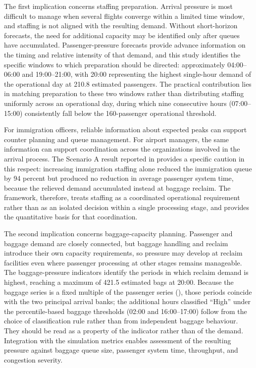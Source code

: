 The first implication concerns staffing preparation. Arrival pressure is most difficult to manage when several flights converge within a limited time window, and staffing is not aligned with the resulting demand. Without short-horizon forecasts, the need for additional capacity may be identified only after queues have accumulated. Passenger-pressure forecasts provide advance information on the timing and relative intensity of that demand, and this study identifies the specific windows to which preparation should be directed: approximately 04:00--06:00 and 19:00--21:00, with 20:00 representing the highest single-hour demand of the operational day at 210.8 estimated passengers. The practical contribution lies in matching preparation to these two windows rather than distributing staffing uniformly across an operational day, during which nine consecutive hours (07:00--15:00) consistently fall below the 160-passenger operational threshold.

For immigration officers, reliable information about expected peaks can support counter planning and queue management. For airport managers, the same information can support coordination across the organizations involved in the arrival process. The Scenario A result reported in  provides a specific caution in this respect: increasing immigration staffing alone reduced the immigration queue by 94 percent but produced no reduction in average passenger system time, because the relieved demand accumulated instead at baggage reclaim. The framework, therefore, treats staffing as a coordinated operational requirement rather than as an isolated decision within a single processing stage, and provides the quantitative basis for that coordination.

The second implication concerns baggage-capacity planning. Passenger and baggage demand are closely connected, but baggage handling and reclaim introduce their own capacity requirements, so pressure may develop at reclaim facilities even where passenger processing at other stages remains manageable. The baggage-pressure indicators identify the periods in which reclaim demand is highest, reaching a maximum of 421.5 estimated bags at 20:00. Because the baggage series is a fixed multiple of the passenger series (), those periods coincide with the two principal arrival banks; the additional hours classified ``High'' under the percentile-based baggage thresholds (02:00 and 16:00--17:00) follow from the choice of classification rule rather than from independent baggage behaviour. They should be read as a property of the indicator rather than of the demand. Integration with the simulation metrics enables assessment of the resulting pressure against baggage queue size, passenger system time, throughput, and congestion severity.

